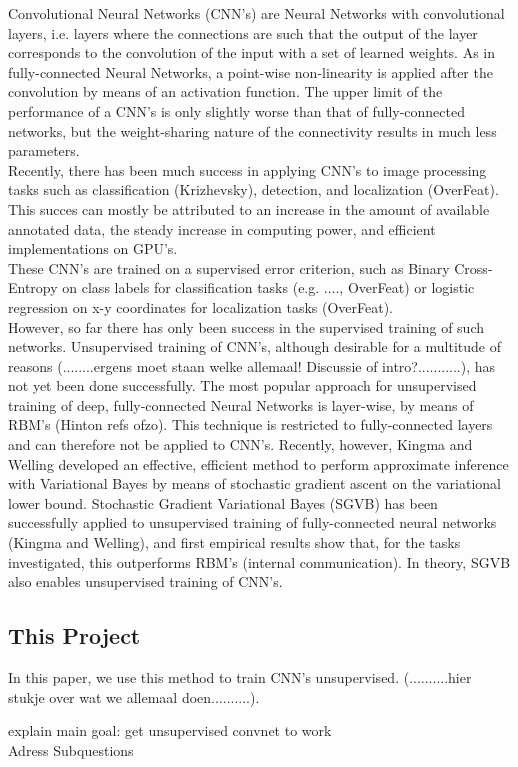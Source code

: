 Convolutional Neural Networks (CNN's) are Neural Networks with convolutional layers, i.e. layers where the connections are such that the output of the layer corresponds to the convolution of the input with a set of learned weights. As in fully-connected Neural Networks, a point-wise non-linearity is applied after the convolution by means of an activation function. The upper limit of the performance of a CNN's is only slightly worse than that of fully-connected networks, but the weight-sharing nature of the connectivity results in much less parameters. \\
Recently, there has been much success in applying CNN's to image processing tasks such as classification (Krizhevsky), detection, and localization (OverFeat). This succes can mostly be attributed to an increase in the amount of available annotated data, the steady increase in computing power, and efficient implementations on GPU's. \\
These CNN's are trained on a supervised error criterion, such as Binary Cross-Entropy on class labels for classification tasks (e.g. ...., OverFeat) or logistic regression on x-y coordinates for localization tasks (OverFeat).\\
However, so far there has only been success in the supervised training of such networks. Unsupervised training of CNN's, although desirable for a multitude of reasons (........ergens moet staan welke allemaal! Discussie of intro?...........), has not yet been done successfully. The most popular approach for unsupervised training of deep, fully-connected Neural Networks is layer-wise, by means of RBM's (Hinton refs ofzo). This technique is restricted to fully-connected layers and can therefore not be applied to CNN's. Recently, however, Kingma and Welling developed an effective, efficient method to perform approximate inference with Variational Bayes by means of stochastic gradient ascent on the variational lower bound. Stochastic Gradient Variational Bayes (SGVB) has been successfully applied to unsupervised training of fully-connected neural networks (Kingma and Welling), and first empirical results show that, for the tasks investigated, this outperforms RBM's (internal communication). In theory, SGVB also enables unsupervised training of CNN's. \\ 


\subsection{This Project}
In this paper, we use this method to train CNN's unsupervised. (..........hier stukje over wat we allemaal doen..........).

explain main goal: get unsupervised convnet to work \\
Adress Subquestions
\newpage



